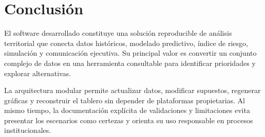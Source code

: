 \documentclass[11pt,a4paper]{article}
\begin{document}
\section{Conclusión}

El software desarrollado constituye una solución reproducible de análisis territorial que conecta datos históricos, modelado predictivo, índice de riesgo, simulación y comunicación ejecutiva. Su principal valor es convertir un conjunto complejo de datos en una herramienta consultable para identificar prioridades y explorar alternativas.

La arquitectura modular permite actualizar datos, modificar supuestos, regenerar gráficas y reconstruir el tablero sin depender de plataformas propietarias. Al mismo tiempo, la documentación explícita de validaciones y limitaciones evita presentar los escenarios como certezas y orienta su uso responsable en procesos institucionales.
\end{document}
